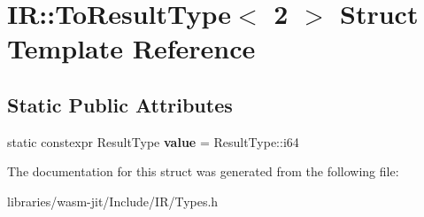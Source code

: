 \hypertarget{struct_i_r_1_1_to_result_type_3_012_01_4}{}\section{IR\+:\+:To\+Result\+Type$<$ 2 $>$ Struct Template Reference}
\label{struct_i_r_1_1_to_result_type_3_012_01_4}
\subsection*{Static Public Attributes}
\begin{DoxyCompactItemize}
\item 
\mbox{\label{struct_i_r_1_1_to_result_type_3_012_01_4_ac87b17a5e9ea8c8ea8fbb7582f81e53e}} 
static constexpr Result\+Type {\bfseries value} = Result\+Type\+::i64
\end{DoxyCompactItemize}


The documentation for this struct was generated from the following file\+:\begin{DoxyCompactItemize}
\item 
libraries/wasm-\/jit/\+Include/\+I\+R/Types.\+h\end{DoxyCompactItemize}
